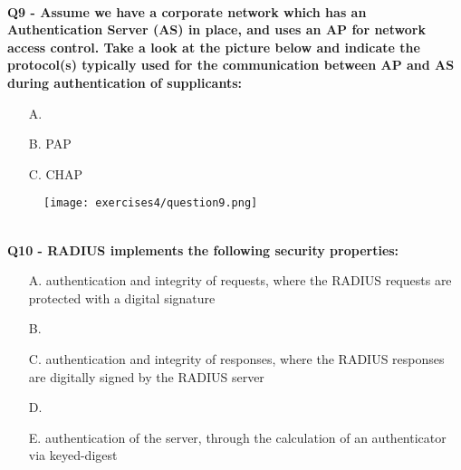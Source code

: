 \textbf{\\Q9 - Assume we have a corporate network which has an Authentication Server (AS) in place, and uses an AP for network access control. 
Take a look at the picture below and indicate the protocol(s) typically used for the communication between AP and AS during authentication of supplicants:}
\begin{itemize}
    \item[A.] 
    \item[B.] PAP
    \item[C.] CHAP
\end{itemize}
\begin{figure}[h]
    \centering
    \texttt{[image: exercises4/question9.png]}
\end{figure}


\textbf{\\Q10 - RADIUS implements the following security properties:}
\begin{itemize}
    \item[A.] authentication and integrity of requests, where the RADIUS requests are protected with a digital signature
    \item[B.] 
    \item[C.] authentication and integrity of responses, where the RADIUS responses are digitally signed by the RADIUS server
    \item[D.] 
    \item[E.] authentication of the server, through the calculation of an authenticator via keyed-digest
\end{itemize}


